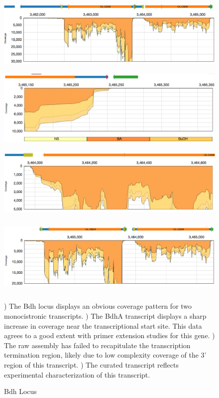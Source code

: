 \begin{figure}
{\includegraphics[width=\textwidth,height=1.5in]{images/Assembly/Examples/Bdh/Bdh-locus.png}
\label{fig:5.13a}}
{\includegraphics[width=\textwidth,height=1.5in]{images/Assembly/Examples/Bdh/BdhA-TSS.png}
\label{fig:5.13b}}
{\includegraphics[width=\textwidth,height=1.5in]{images/Assembly/Examples/Bdh/BdhA-termination.png}
\label{fig:5.13c}}
{\includegraphics[width=\textwidth,height=1.5in]{images/Assembly/Examples/Bdh/Bdh-curated.png}
\label{fig:5.13d}}
\caption{Bdh Locus}
) The Bdh locus displays an obvious coverage pattern for two monocistronic transcripts. ) The BdhA transcript displays a sharp increase in coverage near the transcriptional start site. This data agrees to a good extent with primer extension studies for this gene. ) The raw assembly has failed to recapitulate the transcription termination region, likely due to low complexity coverage of the 3' region of this transcript. ) The curated transcript reflects experimental characterization of this transcript\cite{73}.
\end{figure}

